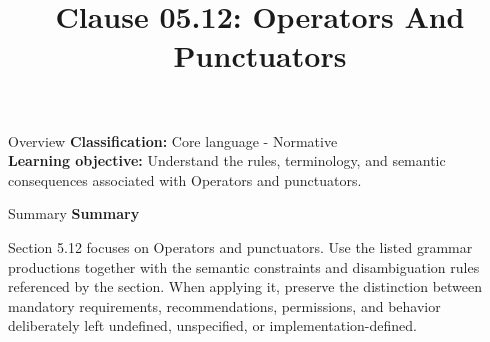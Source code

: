 \documentclass[10pt,letterpaper]{article}
\title{Clause 05.12: Operators And Punctuators}
\author{}
\date{}
\begin{document}
\maketitle
\begin{CornellOverviewBox}{Overview}
\textbf{Classification:} Core language - Normative\\[2pt]
\textbf{Learning objective:} Understand the rules, terminology, and semantic consequences associated with Operators and punctuators.
\end{CornellOverviewBox}\begin{CornellSummaryBox}{Summary}
{\sffamily\bfseries\color{Accent} Summary}\par\vspace{3pt}Section 5.12 focuses on Operators and punctuators. Use the listed grammar productions together with the semantic constraints and disambiguation rules referenced by the section. When applying it, preserve the distinction between mandatory requirements, recommendations, permissions, and behavior deliberately left undefined, unspecified, or implementation-defined.
\end{CornellSummaryBox}
\end{document}
